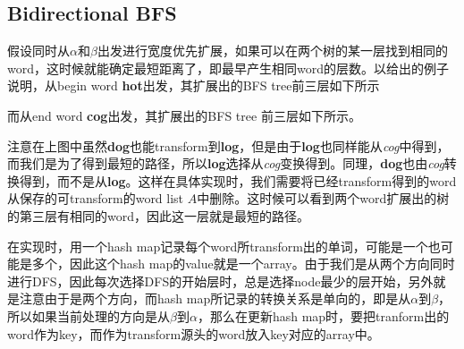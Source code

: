 \subsection{Bidirectional BFS}
假设同时从$\alpha$和$\beta$出发进行宽度优先扩展，如果可以在两个树的某一层找到相同的word，这时候就能确定最短距离了，即最早产生相同word的层数。以给出的例子说明，从begin word \textbf{hot}出发，其扩展出的BFS tree前三层如下所示
\begin{figure}[H]
\end{figure}
而从end word \textbf{cog}出发，其扩展出的BFS tree 前三层如下所示。
\begin{figure}[H]
\end{figure}
注意在上图中虽然\textbf{dog}也能transform到\textbf{log}，但是由于\textbf{log}也同样能从\textit{cog}中得到，而我们是为了得到最短的路径，所以\textbf{log}选择从\textit{cog}变换得到。同理，\textbf{dog}也由\textit{cog}转换得到，而不是从\textbf{log}。这样在具体实现时，我们需要将已经transform得到的word从保存的可transform的word list $A$中删除。这时候可以看到两个word扩展出的树的第三层有相同的word，因此这一层就是最短的路径。

在实现时，用一个hash map记录每个word所transform出的单词，可能是一个也可能是多个，因此这个hash map的value就是一个array。由于我们是从两个方向同时进行DFS，因此每次选择DFS的开始层时，总是选择node最少的层开始，另外就是注意由于是两个方向，而hash map所记录的转换关系是单向的，即是从$\alpha$到$\beta$，所以如果当前处理的方向是从$\beta$到$\alpha$，那么在更新hash map时，要把tranform出的word作为key，而作为transform源头的word放入key对应的array中。

